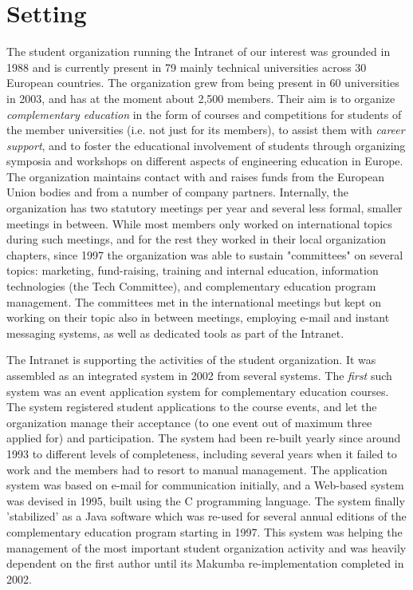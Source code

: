 \documentclass{acm_proc_article-sp}
\begin{document}

\section{Setting}\label{sec:setting}
The student organization running the Intranet of our interest was grounded in 1988 and is currently present in 79 mainly technical universities across 30 European countries. The organization grew from being present in 60 universities in 2003, and has at the moment about 2,500 members. Their aim is to organize {\it complementary education} in the form of courses and competitions for students of the member universities (i.e. not just for its members), to assist them with {\it career support}, and to foster the educational involvement of students through organizing symposia and workshops on different aspects of engineering education in Europe.
The organization maintains contact with and raises funds from the European Union bodies and from a number of company partners. Internally, the organization has two statutory meetings per year and several less formal, smaller meetings in between. While most members only worked on international topics during such meetings, and for the rest they worked in their local organization chapters, since 1997 the organization was able to sustain "committees" on several topics: marketing, fund-raising, training and internal education, information technologies (the Tech Committee), and complementary education program management. The committees met in the international meetings but kept on working on their topic also in between meetings, employing e-mail and instant messaging systems, as well as dedicated tools as part of the Intranet.

The Intranet is supporting the activities of the student organization. It was assembled as an integrated system in 2002 from several systems. The {\it first} such system was an event application system for complementary education courses. The system registered student applications to the course events, and let the organization manage their acceptance (to one event out of maximum three applied for) and participation. The system had been re-built yearly since around 1993 to different levels of completeness, including several years when it failed to work and the members had to resort to manual management. The application system was based on e-mail for communication initially, and a Web-based system was devised in 1995, built using the C programming language. The system finally 'stabilized' as a Java software which was re-used for several annual editions of the complementary education program starting in 1997. This system was helping the management of the most important student organization activity and was heavily dependent on the first author until its Makumba re-implementation completed in 2002.
\end{document}

